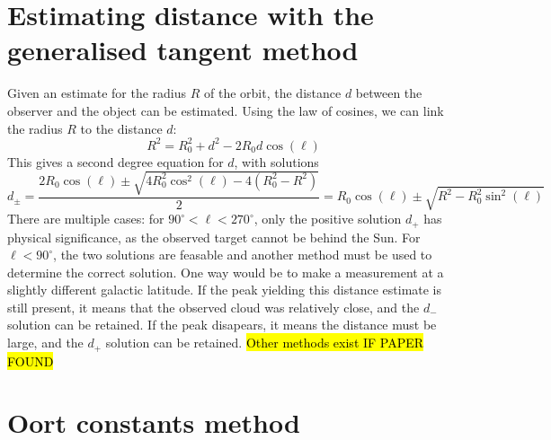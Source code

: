 \section{Estimating distance with the generalised tangent method}
\label{sec:distance_with_tangent_method}
Given an estimate for the radius $R$ of the orbit, the distance $d$ between the observer and the object can be estimated. Using the law of cosines, we can link the radius $R$ to the distance $d$:
\begin{equation}
    R^2 = R_0^2 + d^2 - 2 R_0 d \cos(\ell)
\end{equation}
This gives a second degree equation for $d$, with solutions
\begin{equation}
    d_\pm = \frac{2R_0 \cos(\ell) \pm \sqrt{4R_0^2 \cos^2(\ell) - 4(R_0^2 - R^2)}}{2} = R_0 \cos(\ell) \pm \sqrt{R^2 - R_0^2 \sin^2(\ell)}
\end{equation}
There are multiple cases: for $90^\circ < \ell < 270^\circ$, only the positive solution $d_+$ has physical significance, as the observed target cannot be behind the Sun. For $\ell < 90^\circ$, the two solutions are feasable and another method must be used to determine the correct solution. One way would be to make a measurement at a slightly different galactic latitude. If the peak yielding this distance estimate is still present, it means that the observed cloud was relatively close, and the $d_-$ solution can be retained. If the peak disapears, it means the distance must be large, and the $d_+$ solution can be retained. \hl{Other methods exist IF PAPER FOUND}

\section{Oort constants method}
\label{sec:oort_method}

